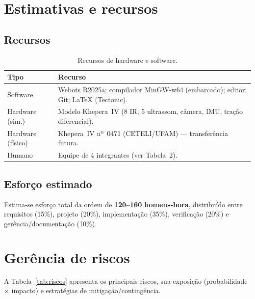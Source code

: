 \section{Estimativas e recursos}
\subsection{Recursos}
\begin{table}[H]\centering
\caption{Recursos de hardware e software.}
\begin{tabularx}{\textwidth}{@{}l X@{}}
\toprule
\textbf{Tipo} & \textbf{Recurso} \\
\midrule
Software & Webots R2025a; compilador MinGW-w64 (embarcado); editor; Git; \LaTeX{} (Tectonic). \\
Hardware (sim.) & Modelo Khepera~IV (8 IR, 5 ultrassom, câmera, IMU, tração diferencial). \\
Hardware (físico) & Khepera~IV nº~0471 (CETELI/UFAM) --- transferência futura. \\
Humano & Equipe de 4 integrantes (ver Tabela~2). \\
\bottomrule
\end{tabularx}
\end{table}

\subsection{Esforço estimado}
Estima-se esforço total da ordem de \textbf{120--160 homens-hora}, distribuído entre requisitos (15\%), projeto (20\%), implementação (35\%), verificação (20\%) e gerência/documentação (10\%).

\section{Gerência de riscos}
A Tabela~\ref{tab:riscos} apresenta os principais riscos, sua exposição (probabilidade $\times$ impacto) e estratégias de mitigação/contingência.


